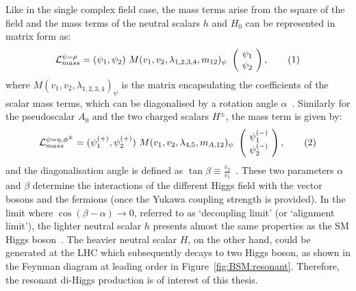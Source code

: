Like in the single complex field case, the mass terms arise from the square of the field and
the mass terms of the neutral scalars $h$ and $H_0$ can be represented in matrix form as:
\[
\mathcal{L}_{mass}^{ \psi = \rho }   = (\psi_1, \psi_2)\ M(v_1,v_2,\lambda_{1,2,3,4}, m_{12})_\psi\ \begin{pmatrix} 
    \psi_1 \\ \  \psi_2 \ 
    \end{pmatrix},
\addtag \]
where $M(v_1,v_2,\lambda_{1,2,3,4})_\psi$ is the matrix encapsulating the coefficients of the scalar mass terms,
which can be diagonalised by a rotation angle $\alpha$~\cite{2HDM-Branco}.
Similarly for the pseudoscalar $A_0$ and the two charged scalars $H^\pm$,
the mass term is given by:
\[
\mathcal{L}_{mass}^{ \psi = \eta, \phi^\pm }   = (\psi_1^{(+)}, \psi_2^{(+)})\ M(v_1,v_2,\lambda_{4,5}, m_{A,12})_\psi\ \begin{pmatrix} 
    \psi_1^{(-)} \\ \  \psi_2^{(-)} \ 
    \end{pmatrix},
\addtag \]
and the diagonalisation angle is defined as $\tan\beta \equiv \frac{v_2}{v_1}$~\cite{2HDM-Branco}.
These two parameters $\alpha$ and $\beta$ determine the interactions of the different Higgs
field with the vector bosons and the fermions (once the Yukawa coupling strength is provided).
In the limit where $\cos(\beta - \alpha) \rightarrow 0$, referred to as `decoupling limit' (or `alignment limit'), 
the lighter neutral scalar $h$ presents almost the same properties as the SM Higgs boson~\cite{decoupling}.
The heavier neutral scalar $H$, on the other hand, could be generated at the LHC which subsequently
decays to two Higgs boson, as shown in the Feynman diagram at leading order in 
Figure~\ref{fig:BSM:resonant}.
Therefore, the resonant di-Higgs production is of interest of this thesis. 

